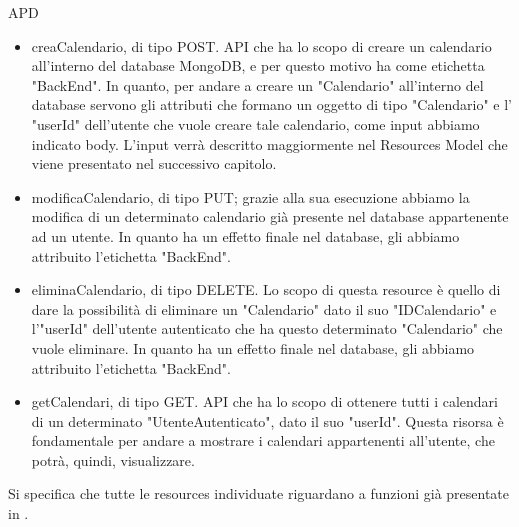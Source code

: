 \begin{listaPersonale} {APD}
\begin{listaPersonale2}[APD]{}
\begin{itemize}
                  \begin{itemize}
                      \item creaCalendario, di tipo POST. API che ha lo scopo di creare un calendario all'interno del database MongoDB, e per questo motivo ha come etichetta "BackEnd". In quanto, per andare a creare un "Calendario" all'interno del database servono gli attributi che formano un oggetto di tipo "Calendario" e l' "userId" dell'utente che vuole creare tale calendario, come input abbiamo indicato body. L'input verrà descritto maggiormente nel Resources Model che viene presentato nel successivo capitolo.
                      \item modificaCalendario, di tipo PUT; grazie alla sua esecuzione abbiamo la modifica di un determinato calendario già presente nel database appartenente ad un utente. In quanto ha un effetto finale nel database, gli abbiamo attribuito l'etichetta "BackEnd".
                      \item eliminaCalendario, di tipo DELETE. Lo scopo di questa resource è quello di dare la possibilità di eliminare un "Calendario" dato il suo "IDCalendario" e l'"userId" dell'utente autenticato che ha questo determinato "Calendario" che vuole eliminare. In quanto ha un effetto finale nel database, gli abbiamo attribuito l'etichetta "BackEnd".
                      \item getCalendari, di tipo GET. API che ha lo scopo di ottenere tutti i calendari di un determinato "UtenteAutenticato", dato il suo "userId". Questa risorsa è fondamentale per andare a mostrare i calendari appartenenti all'utente, che potrà, quindi, visualizzare.
                  \end{itemize}
                  Si specifica che tutte le resources individuate riguardano a funzioni già presentate in .
        \end{itemize}

        \begin{center}
            
        \end{center}
        \newpage



\end{listaPersonale2}
\end{listaPersonale}
